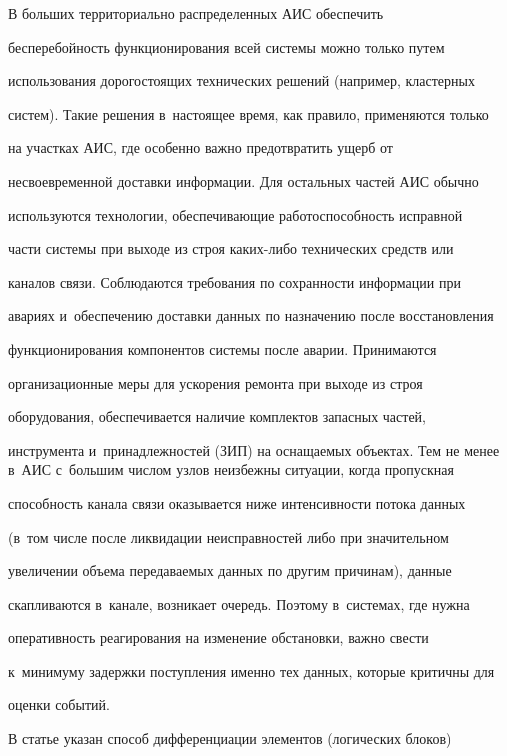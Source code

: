   В больших территориально распределенных АИС обеспечить 


бес\-пе\-ре\-бой\-ность функционирования всей сис\-те\-мы мож\-но только путем 


использования до\-ро\-го\-сто\-ящих технических решений (например, клас\-тер\-ных 


сис\-тем). Такие решения в~на\-сто\-ящее время, как правило, применяются только 


на участках АИС, где особенно важ\-но предотвратить ущерб от 


несвоевременной до\-став\-ки информации. Для остальных частей АИС обычно 


используются технологии, обеспечивающие ра\-бо\-то\-спо\-соб\-ность ис\-прав\-ной 


час\-ти сис\-те\-мы при выходе из строя ка\-ких-ли\-бо технических средств или 


каналов связи. Соблюдаются требования по со\-хран\-ности информации при 


авариях и~обеспечению до\-став\-ки данных по назначению после вос\-ста\-нов\-ле\-ния 


функционирования компонентов сис\-те\-мы после аварии. Принимаются 


организационные меры для уско\-ре\-ния ремонта при выходе из строя 


оборудования, обеспечивается наличие комплектов запасных час\-тей, 


инструмента и~принадлежностей (ЗИП) на оснащаемых объектах. Тем не менее в~АИС с~большим чис\-лом узлов неизбежны ситуации, когда про\-пуск\-ная 


спо\-соб\-ность канала связи оказывается ниже ин\-тен\-сив\-ности потока данных 


(в~том чис\-ле после ликвидации неисправностей либо при значительном 


увеличении объема передаваемых данных по другим причинам), данные 


скапливаются в~канале, возникает очередь. Поэтому в~сис\-те\-мах, где нуж\-на 


оперативность реагирования на изменение обстановки, важ\-но свести 


к~минимуму задержки поступления именно тех данных, которые критичны для 


оценки событий. 


  


  В статье указан способ дифференциации элементов (логических блоков) 


